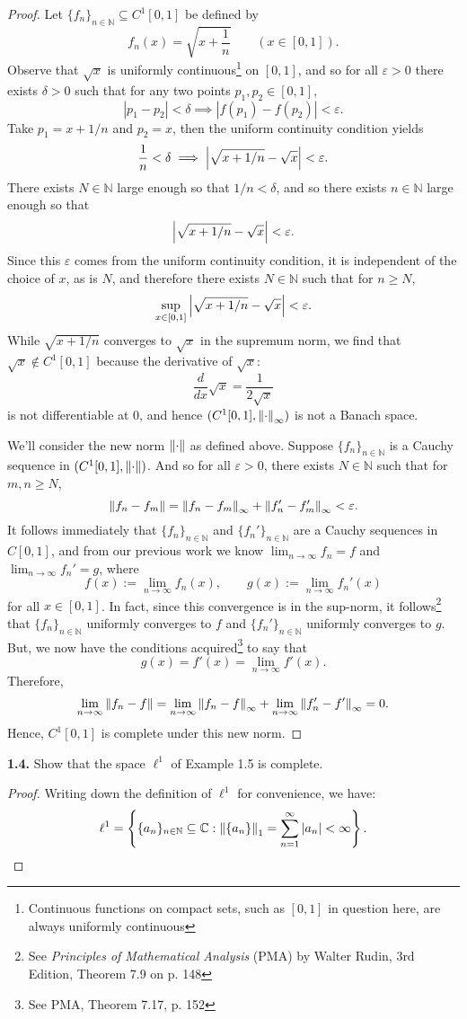 \documentclass[12pt]{article}
\theoremstyle{definition}
\begin{document}
		\begin{proof}
			Let $\{f_n\}_{n \in \mathbb{N}} \subseteq C^1[0, 1]$ be defined by $$f_n(x) = \sqrt{x + \frac{1}{n}} \qquad (x \in [0, 1]).$$ Observe that $\sqrt{x}$ is uniformly continuous\footnote{Continuous functions on compact sets, such as $[0, 1]$ in question here, are always uniformly continuous} on $[0, 1]$, and so for all $\varepsilon > 0$ there exists $\delta > 0$ such that for any two points $p_1, p_2 \in [0, 1]$, $$|p_1 - p_2| < \delta \implies |f(p_1) - f(p_2)| < \varepsilon.$$  Take $p_1 = x + 1/n$ and $p_2 = x$, then the uniform continuity condition yields $$\frac{1}{n} < \delta \implies \abs{\sqrt{x + 1/n} - \sqrt{x}} < \varepsilon.$$ There exists $N \in \mathbb{N}$ large enough so that $1/n < \delta$, and so there exists $n \in \mathbb{N}$ large enough so that $$\abs{\sqrt{x + 1/n} - \sqrt{x}} < \varepsilon.$$ Since this $\varepsilon$ comes from the uniform continuity condition, it is independent of the choice of $x$, as is $N$, and therefore there exists $N \in \mathbb{N}$ such that for $n \geq N$, $$\sup_{x \in [0, 1]} \abs{\sqrt{x + 1/n} - \sqrt{x}} < \varepsilon.$$ While $\sqrt{x + 1/n}$ converges to $\sqrt{x}$ in the supremum norm, we find that $\sqrt{x} \notin C^1[0, 1]$ because the derivative of $\sqrt{x}$: $$\frac{d}{dx} \sqrt{x} = \frac{1}{2 \sqrt{x}}$$ is not differentiable at 0, and hence $(C^1[0, 1], \norm{\cdot}_\infty)$ is not a Banach space. 
			
			
			
			We'll consider the new norm $\norm{\cdot}$ as defined above. Suppose $\{f_n\}_{n \in \mathbb{N}}$ is a Cauchy sequence in $(C^1[0, 1], \norm{\cdot})$. And so for all $\varepsilon > 0$, there exists $N \in \mathbb{N}$ such that for $m,n \geq N$, $$\norm{f_n - f_m} = \norm{f_n - f_m}_\infty + \norm{f_n' - f_m'}_\infty < \varepsilon.$$ It follows immediately that $\{f_n\}_{n \in \mathbb{N}}$ and $\{f_n'\}_{n \in \mathbb{N}}$ are a Cauchy sequences in $C[0,1]$, and from our previous work we know $\lim_{n \to \infty} f_n = f$ and $\lim_{n \to \infty} f_n' = g$, where $$f(x) := \lim_{n \to \infty} f_n(x), \qquad g(x) := \lim_{n \to \infty} f_n'(x)$$ for all $x \in [0, 1]$. In fact, since this convergence is in the sup-norm, it follows\footnote{See \textit{Principles of Mathematical Analysis} (PMA) by Walter Rudin, 3rd Edition, Theorem 7.9 on p. 148} that $\{f_n\}_{n \in \mathbb{N}}$ uniformly converges to $f$ and $\{f_n'\}_{n \in \mathbb{N}}$ uniformly converges to $g$. But, we now have the conditions acquired\footnote{See PMA, Theorem 7.17, p. 152} to say that $$g(x) = f'(x) = \lim_{n \to \infty} f'(x).$$ Therefore, $$\lim_{n \to \infty} \norm{f_n - f} = \lim_{n \to \infty} \norm{f_n - f}_\infty + \lim_{n \to \infty} \norm{f_n' - f'}_\infty = 0.$$ Hence, $C^1[0,1]$ is complete under this new norm. 
		\end{proof}
	
	\newpage 
	\noindent \textbf{1.4.} Show that the space $\ell^1$ of Example 1.5 is complete. 
		\begin{proof}
			Writing down the definition of $\ell^1$ for convenience, we have:
				$$\ell^1 = \left\{\{a_n\}_{n \in \mathbb{N}} \subseteq \mathbb{C} : \norm{\{a_n\}}_1 = \sum_{n = 1}^\infty |a_n| < \infty \right\}.$$ 
		\end{proof} 
\end{document}
